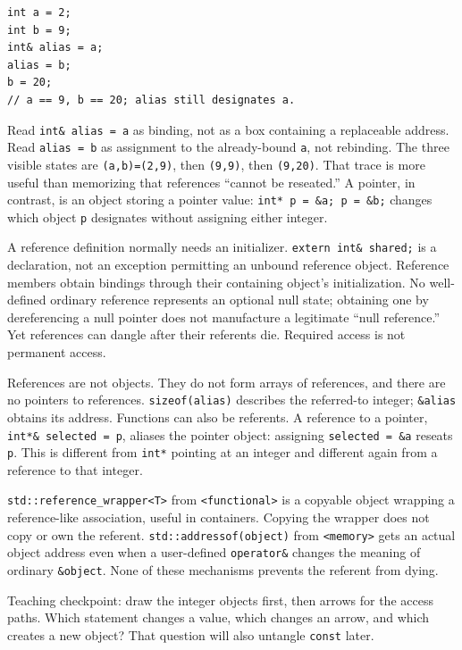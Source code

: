 \begin{verbatim}
int a = 2;
int b = 9;
int& alias = a;
alias = b;
b = 20;
// a == 9, b == 20; alias still designates a.
\end{verbatim}

Read \texttt{int\&\ alias\ =\ a} as binding, not as a box containing a replaceable address. Read \texttt{alias\ =\ b} as assignment to the already-bound \texttt{a}, not rebinding. The three visible states are \texttt{(a,b)=(2,9)}, then \texttt{(9,9)}, then \texttt{(9,20)}. That trace is more useful than memorizing that references ``cannot be reseated.'' A pointer, in contrast, is an object storing a pointer value: \texttt{int*\ p\ =\ \&a;\ p\ =\ \&b;} changes which object \texttt{p} designates without assigning either integer.

A reference definition normally needs an initializer. \texttt{extern\ int\&\ shared;} is a declaration, not an exception permitting an unbound reference object. Reference members obtain bindings through their containing object's initialization. No well-defined ordinary reference represents an optional null state; obtaining one by dereferencing a null pointer does not manufacture a legitimate ``null reference.'' Yet references can dangle after their referents die. Required access is not permanent access.

References are not objects. They do not form arrays of references, and there are no pointers to references. \texttt{sizeof(alias)} describes the referred-to integer; \texttt{\&alias} obtains its address. Functions can also be referents. A reference to a pointer, \texttt{int*\&\ selected\ =\ p}, aliases the pointer object: assigning \texttt{selected\ =\ \&a} reseats \texttt{p}. This is different from \texttt{int*} pointing at an integer and different again from a reference to that integer.

\texttt{std::reference\_wrapper\textless{}T\textgreater{}} from \texttt{\textless{}functional\textgreater{}} is a copyable object wrapping a reference-like association, useful in containers. Copying the wrapper does not copy or own the referent. \texttt{std::addressof(object)} from \texttt{\textless{}memory\textgreater{}} gets an actual object address even when a user-defined \texttt{operator\&} changes the meaning of ordinary \texttt{\&object}. None of these mechanisms prevents the referent from dying.

Teaching checkpoint: draw the integer objects first, then arrows for the access paths. Which statement changes a value, which changes an arrow, and which creates a new object? That question will also untangle \texttt{const} later.

